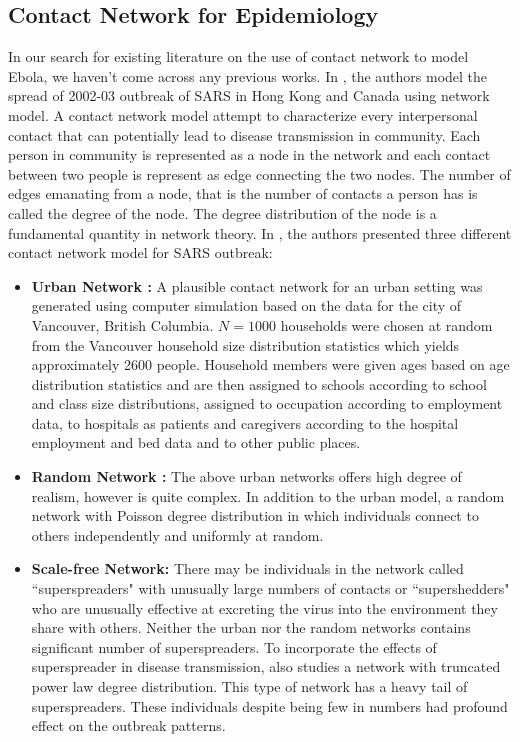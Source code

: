 \documentclass[10pt, journal,onecolumn]{IEEEtran}
\begin{document}
\subsection{\textbf{Contact Network for Epidemiology \citep{meyers2005network}}}
In our search for existing literature on the use of contact network to model Ebola, we haven't come across any previous works. In \citep{meyers2005network}, the authors model the spread of 2002-03 outbreak of SARS in Hong Kong and Canada using network model. A contact network model attempt to characterize every interpersonal contact that can potentially lead to disease transmission in community. Each person in community is represented as a node in the network and each contact between two people is represent as edge connecting the two nodes. The number of edges emanating from a node, that is the number of contacts a person has is called the degree of the node. The degree distribution of the node is a fundamental quantity in network theory.   In \citep{meyers2005network}, the authors presented three different contact network model for SARS outbreak:

\begin{itemize}
\item \textbf{Urban Network : }  A plausible contact network for an urban setting was generated using computer simulation based on the data for the city of Vancouver, British Columbia. $N=1000$ households were chosen at random from the Vancouver household size distribution statistics which yields approximately 2600 people. Household members were given ages based on age distribution statistics and are then assigned to schools according to school and class size distributions, assigned to occupation according to employment data, to hospitals as patients and caregivers according to the hospital employment and bed data and to other public places.
\item \textbf{Random Network : } The above urban networks offers high degree of realism, however is quite complex. In addition to the urban model, a random network with Poisson degree distribution in which individuals connect to others independently and uniformly at random.
\item \textbf{Scale-free Network: } There may be individuals in the network called ``superspreaders" with unusually large numbers of contacts or ``supershedders" who are unusually effective at excreting the virus into the environment they share with others. Neither the urban nor the random networks contains significant number of superspreaders. To incorporate the effects of superspreader in disease transmission, \citep{meyers2005network} also studies a network with truncated power law degree distribution. This type of network has a heavy tail of superspreaders. These individuals despite being few in numbers had profound effect on the outbreak patterns.
\end{itemize}
\end{document}
